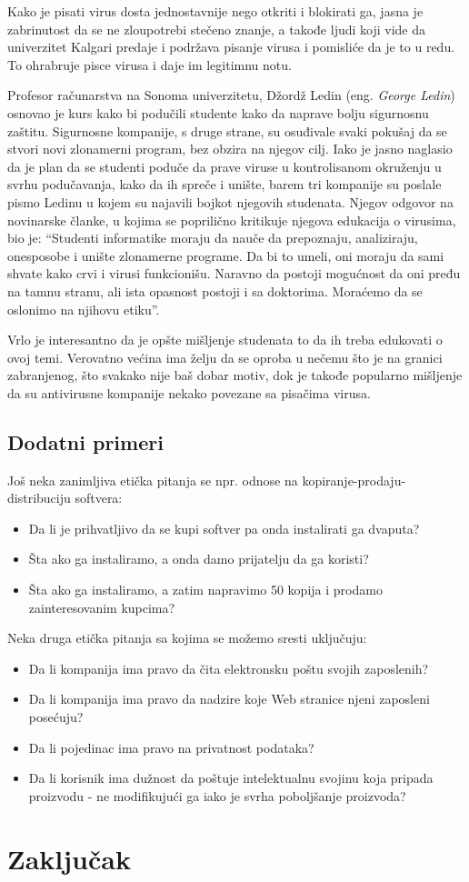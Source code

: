 \documentclass[a4paper]{article}
\begin{document}
Kako je pisati virus dosta jednostavnije nego otkriti i blokirati ga, jasna je zabrinutost da se ne zloupotrebi stečeno znanje, a takođe ljudi koji vide da univerzitet Kalgari predaje i podržava pisanje virusa i pomisliće da je to u redu. 
To ohrabruje pisce virusa i daje im legitimnu notu.

Profesor računarstva na Sonoma univerzitetu, Džordž Ledin (eng. \textit{George Ledin}) osnovao je kurs kako bi podučili studente kako da naprave bolju sigurnosnu zaštitu. Sigurnosne kompanije, s druge strane, su osuđivale
svaki pokušaj da se stvori novi zlonamerni program, bez obzira na njegov cilj. Iako je jasno naglasio da je plan da se studenti poduče da prave viruse u kontrolisanom okruženju u svrhu podučavanja, kako da
ih spreče i unište, barem tri kompanije su poslale pismo Ledinu u kojem su najavili bojkot njegovih studenata.
Njegov odgovor na novinarske članke, u kojima se poprilično kritikuje njegova edukacija o virusima, bio je: ``Studenti informatike moraju da nauče da prepoznaju, analiziraju, onesposobe i unište zlonamerne programe.
Da bi to umeli, oni moraju da sami shvate kako crvi i virusi funkcionišu. Naravno da postoji mogućnost da oni pređu na tamnu stranu, ali ista opasnost postoji i sa doktorima. Moraćemo da se oslonimo na njihovu etiku''.


Vrlo je interesantno da je opšte mišljenje studenata to da ih treba edukovati o ovoj temi. Verovatno većina ima želju da se oproba u nečemu što je na granici zabranjenog, što svakako nije baš dobar motiv,
dok je takođe popularno mišljenje da su antivirusne kompanije nekako povezane sa pisačima virusa.

\subsection{Dodatni primeri}
Još neka zanimljiva etička pitanja se npr. odnose na kopiranje-prodaju-distribuciju softvera:
\begin{itemize}
\item Da li je prihvatljivo da se kupi softver pa onda instalirati ga dvaputa?
\item Šta ako ga instaliramo, a onda damo prijatelju da ga koristi?
\item Šta ako ga instaliramo, a zatim napravimo 50 kopija i prodamo zainteresovanim kupcima?
\end{itemize}
Neka druga etička pitanja sa kojima se možemo sresti uključuju:
\begin{itemize} 
\item Da li kompanija ima pravo da čita elektronsku poštu svojih zaposlenih?
\item Da li kompanija ima pravo da nadzire koje Web stranice njeni zaposleni posećuju?
\item Da li pojedinac ima pravo na privatnost podataka?
\item Da li korisnik ima dužnost da poštuje intelektualnu svojinu koja pripada proizvodu - ne modifikujući ga iako je svrha poboljšanje proizvoda?
\end{itemize}

\section{Zaključak}
\label{sec:zakljucak}




\appendix
 


\appendix
\end{document}
